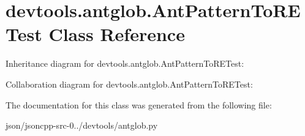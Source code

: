 \hypertarget{classdevtools_1_1antglob_1_1_ant_pattern_to_r_e_test}{\section{devtools.\+antglob.\+Ant\+Pattern\+To\+R\+E\+Test Class Reference}
\label{classdevtools_1_1antglob_1_1_ant_pattern_to_r_e_test}
}


Inheritance diagram for devtools.\+antglob.\+Ant\+Pattern\+To\+R\+E\+Test\+:


Collaboration diagram for devtools.\+antglob.\+Ant\+Pattern\+To\+R\+E\+Test\+:


The documentation for this class was generated from the following file\+:\begin{DoxyCompactItemize}
\item 
json/jsoncpp-\/src-\/0../devtools/antglob.\+py\end{DoxyCompactItemize}
